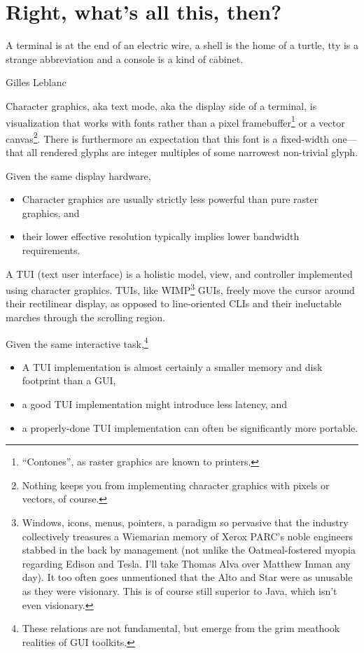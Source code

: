 \documentclass[letterpaper,10pt]{article}
\newenvironment{denseitemize}{
  \begin{itemize}
      \setlength{\itemsep}{0pt}
}{
  \end{itemize}
}
\begin{document}
\section{Right, what's all this, then?}
\label{sec:start}
\epigraph{A terminal is at the end of an electric wire, a shell is the home of a turtle, tty is a strange abbreviation and a console is a kind of cabinet.}{Gilles Leblanc\cite{gillesSO}}
Character graphics, aka text mode, aka the display side of a terminal, is
visualization that works with fonts rather than a pixel framebuffer\footnote{``Contones'', as raster graphics are known to printers.}
or a vector canvas\footnote{Nothing keeps you from implementing character graphics
with pixels or vectors, of course.}. There is furthermore an expectation that
this font is a fixed-width one---that all rendered glyphs are integer multiples
of some narrowest non-trivial glyph.

Given the same display hardware,

\begin{denseitemize}
\item{Character graphics are usually strictly less powerful than pure raster graphics, and}
\item{their lower effective resolution typically implies lower bandwidth requirements.}
\end{denseitemize}

A TUI (text user interface) is a holistic model, view, and controller implemented
using character graphics. TUIs, like WIMP\footnote{Windows, icons, menus, pointers, a paradigm so pervasive that
the industry collectively treasures a Wiemarian\cite{thirdreich} memory of Xerox PARC's noble
engineers stabbed in the back by management (not unlike the Oatmeal-fostered\cite{fuckoatmeal}
myopia regarding Edison and Tesla. I'll take Thomas Alva over Matthew Inman any
day). It too often goes unmentioned that the Alto and Star were as unusable as they were visionary\cite{lightningdealers}.
This is of course still superior to Java, which isn't even visionary.} GUIs,
freely move the cursor around their rectilinear display, as opposed to
line-oriented CLIs and their ineluctable marches through the scrolling region.

Given the same interactive task,\footnote{These relations are not
fundamental, but emerge from the grim meathook realities of GUI toolkits.}

\begin{denseitemize}
\item{A TUI implementation is almost certainly a smaller memory and disk footprint than a GUI,}
\item{a good TUI implementation might introduce less latency, and}
\item{a properly-done TUI implementation can often be significantly more portable.}
\end{denseitemize}
\end{document}
